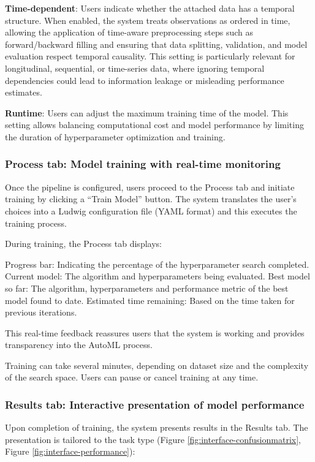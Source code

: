 \documentclass[twoside,final]{Contexto}
\begin{document}
\textbf{Time-dependent}: Users indicate whether the attached data has a temporal structure. When enabled, the system treats observations as ordered in time, allowing the application of time-aware preprocessing steps such as forward/backward filling and ensuring that data splitting, validation, and model evaluation respect temporal causality. This setting is particularly relevant for longitudinal, sequential, or time-series data, where ignoring temporal dependencies could lead to information leakage or misleading performance estimates.

\textbf{Runtime}: Users can adjust the maximum training time of the model. This setting allows balancing computational cost and model performance by limiting the duration of hyperparameter optimization and training.

\subsubsection{Process tab: Model training with real-time monitoring}

Once the pipeline is configured, users proceed to the Process tab and initiate training by clicking a ``Train Model'' button. The system translates the user's choices into a Ludwig configuration file (YAML format) and this executes the training process.

During training, the Process tab displays:

    Progress bar: Indicating the percentage of the hyperparameter search completed.
    Current model: The algorithm and hyperparameters being evaluated.
    Best model so far: The algorithm, hyperparameters and performance metric of the best model found to date.
    Estimated time remaining: Based on the time taken for previous iterations.

This real-time feedback reassures users that the system is working and provides transparency into the AutoML process.

Training can take several minutes, depending on dataset size and the complexity of the search space. Users can pause or cancel training at any time.

\subsubsection{Results tab: Interactive presentation of model performance}

Upon completion of training, the system presents results in the Results tab. The presentation is tailored to the task type (Figure \ref{fig:interface-confusionmatrix}, Figure \ref{fig:interface-performance}):
\end{document}
